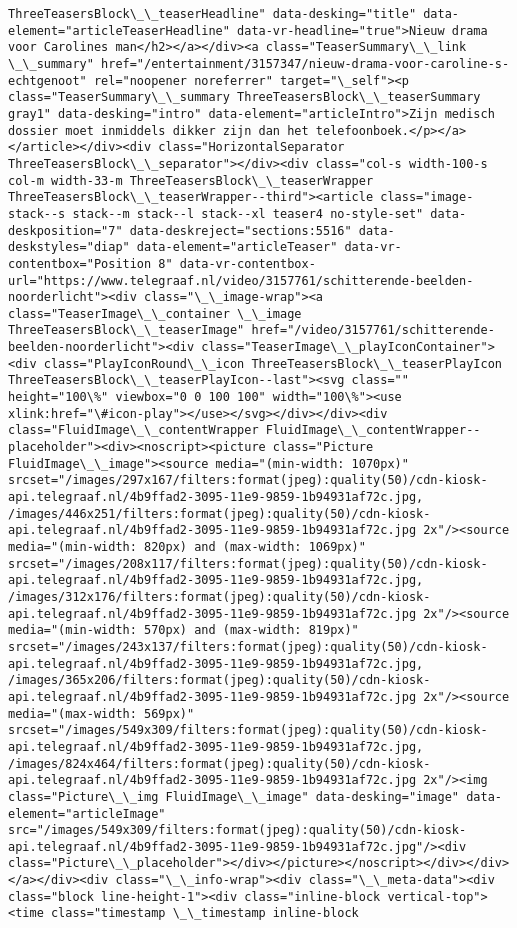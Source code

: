 \documentclass[11pt]{article}
\begin{document}
\begin{Verbatim}[commandchars=\\\{\}]
ThreeTeasersBlock\_\_teaserHeadline" data-desking="title" data-element="articleTeaserHeadline" data-vr-headline="true">Nieuw drama voor Carolines man</h2></a></div><a class="TeaserSummary\_\_link \_\_summary" href="/entertainment/3157347/nieuw-drama-voor-caroline-s-echtgenoot" rel="noopener noreferrer" target="\_self"><p class="TeaserSummary\_\_summary ThreeTeasersBlock\_\_teaserSummary gray1" data-desking="intro" data-element="articleIntro">Zijn medisch dossier moet inmiddels dikker zijn dan het telefoonboek.</p></a></article></div><div class="HorizontalSeparator ThreeTeasersBlock\_\_separator"></div><div class="col-s width-100-s col-m width-33-m ThreeTeasersBlock\_\_teaserWrapper ThreeTeasersBlock\_\_teaserWrapper--third"><article class="image-stack--s stack--m stack--l stack--xl teaser4 no-style-set" data-deskposition="7" data-deskreject="sections:5516" data-deskstyles="diap" data-element="articleTeaser" data-vr-contentbox="Position 8" data-vr-contentbox-url="https://www.telegraaf.nl/video/3157761/schitterende-beelden-noorderlicht"><div class="\_\_image-wrap"><a class="TeaserImage\_\_container \_\_image ThreeTeasersBlock\_\_teaserImage" href="/video/3157761/schitterende-beelden-noorderlicht"><div class="TeaserImage\_\_playIconContainer"><div class="PlayIconRound\_\_icon ThreeTeasersBlock\_\_teaserPlayIcon ThreeTeasersBlock\_\_teaserPlayIcon--last"><svg class="" height="100\%" viewbox="0 0 100 100" width="100\%"><use xlink:href="\#icon-play"></use></svg></div></div><div class="FluidImage\_\_contentWrapper FluidImage\_\_contentWrapper--placeholder"><div><noscript><picture class="Picture FluidImage\_\_image"><source media="(min-width: 1070px)" srcset="/images/297x167/filters:format(jpeg):quality(50)/cdn-kiosk-api.telegraaf.nl/4b9ffad2-3095-11e9-9859-1b94931af72c.jpg, /images/446x251/filters:format(jpeg):quality(50)/cdn-kiosk-api.telegraaf.nl/4b9ffad2-3095-11e9-9859-1b94931af72c.jpg 2x"/><source media="(min-width: 820px) and (max-width: 1069px)" srcset="/images/208x117/filters:format(jpeg):quality(50)/cdn-kiosk-api.telegraaf.nl/4b9ffad2-3095-11e9-9859-1b94931af72c.jpg, /images/312x176/filters:format(jpeg):quality(50)/cdn-kiosk-api.telegraaf.nl/4b9ffad2-3095-11e9-9859-1b94931af72c.jpg 2x"/><source media="(min-width: 570px) and (max-width: 819px)" srcset="/images/243x137/filters:format(jpeg):quality(50)/cdn-kiosk-api.telegraaf.nl/4b9ffad2-3095-11e9-9859-1b94931af72c.jpg, /images/365x206/filters:format(jpeg):quality(50)/cdn-kiosk-api.telegraaf.nl/4b9ffad2-3095-11e9-9859-1b94931af72c.jpg 2x"/><source media="(max-width: 569px)" srcset="/images/549x309/filters:format(jpeg):quality(50)/cdn-kiosk-api.telegraaf.nl/4b9ffad2-3095-11e9-9859-1b94931af72c.jpg, /images/824x464/filters:format(jpeg):quality(50)/cdn-kiosk-api.telegraaf.nl/4b9ffad2-3095-11e9-9859-1b94931af72c.jpg 2x"/><img class="Picture\_\_img FluidImage\_\_image" data-desking="image" data-element="articleImage" src="/images/549x309/filters:format(jpeg):quality(50)/cdn-kiosk-api.telegraaf.nl/4b9ffad2-3095-11e9-9859-1b94931af72c.jpg"/><div class="Picture\_\_placeholder"></div></picture></noscript></div></div></a></div><div class="\_\_info-wrap"><div class="\_\_meta-data"><div class="block line-height-1"><div class="inline-block vertical-top"><time class="timestamp \_\_timestamp inline-block 
\end{Verbatim}
\end{document}
